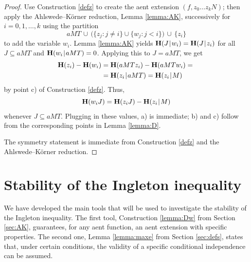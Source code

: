 \documentclass[a4paper]{IEEEtran}
\def\|{\mskip1.5mu{|}\mskip1.5mu}
\def\H{\mathbf H}
\theoremstyle{definition}
\begin{document}
\begin{proof}
Use Construction \ref{defz} to create the aent extension $(f,z_0\dots z_k N)$; 
then apply the Ahlswede--K\"orner reduction, Lemma \ref{lemma:AK}, 
successively for $i=0,1,\dots,k$ using the partition
$$
   aMT\, \cup \, \big(\{z_j:j\neq i\}\cup\{w_j:j<i\}\big)\, \cup\, \{z_i\}
$$
to add the variable $w_i$. Lemma \ref{lemma:AK} yields
$\H(J\|w_i)=\H(J\|z_i)$ for all $J\subseteq aMT$ and $\H(w_i\|aMT)=0$.
Applying this to $J=aMT$, we get
\begin{align*}
   \H(z_i)-\H(w_i)&=\H(aMTz_i)-\H(aMTw_i) ={}\\
                  &=\H(z_i\|aMT)=\H(z_i\|M)
\end{align*}
by point c) of Construction \ref{defz}. Thus,
$$
  \H(w_iJ)=\H(z_iJ)-\H(z_i\|M)
$$
whenever $J\subseteq aMT$. Plugging in these values, a) is immediate; b) and
c) follow from the corresponding points in Lemma \ref{lemma:D}.

The symmetry statement is immediate from Construction \ref{defz} and the
Ahl\-swede--K\"orner reduction.
\end{proof}


\section{Stability of the Ingleton inequality}\label{sec:stab}

We have developed the main tools that will be used to investigate the
stability of the Ingleton inequality. The first tool, Construction
\ref{lemma:Dw} from Section \ref{sec:AK}, guarantees, for any aent function,
an aent extension with specific properties. The second one, Lemma
\ref{lemma:maxe} from Section \ref{sec:defs}, states that, under certain
conditions, the validity of a specific conditional independence can be
assumed.
\end{document}

